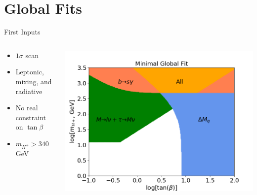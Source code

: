 \documentclass[10pt,xcolor={table,dvipsnames},t]{beamer}
\begin{document}
\section{Global Fits}
\begin{frame}{First Inputs}
    \begin{columns}[T]
        \begin{column}{0.33\textwidth}
            \vspace{1.5em}
            \begin{itemize}
                \item $1\sigma$ scan
                \item Leptonic, mixing, and radiative
                \item No real constraint on $\tan\beta$
                \item $m_{H^+} > 340\,$GeV
            \end{itemize}
        \end{column}
        \begin{column}{0.60\textwidth}
            \includegraphics[scale=0.35]{global}
        \end{column}
    \end{columns}
\end{frame}
\end{document}
